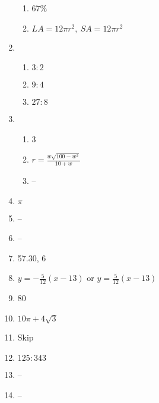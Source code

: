 \documentclass{article}
\begin{document}
\begin{enumerate}
	\begin{enumerate}
	
	\item 67\%
	
	\item $LA = 12 \pi r^2, \ SA = 12 \pi r^2$
	
	\end{enumerate}
	
\item

	\begin{enumerate}
	
	\item $3:2$
	
	\item $9:4$
	
	\item $27:8$
	
	\end{enumerate}
	
\item

	\begin{enumerate}
	
	\item 3
	
	\item $r = \frac{w \sqrt{100 - w^2}}{10 + w}$
	
	\item --
	
	\end{enumerate}
	
\item $\pi$

\item --

\item --

\item 57.30, 6

\item $y = -\frac{5}{12} (x - 13)$ or $y = \frac{5}{12} (x - 13)$

\item 80

\item $10 \pi + 4 \sqrt{3}$

\item Skip

\item $125 : 343$

\item --

\item --


\end{enumerate}
\end{document}
